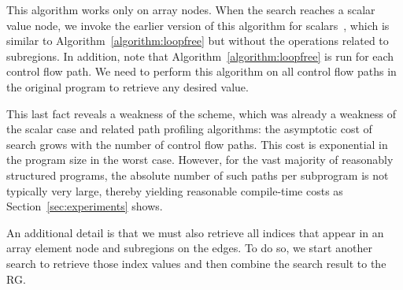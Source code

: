 This algorithm works only on array nodes.
When the search reaches a scalar value node, we invoke the earlier version of this algorithm for scalars~\cite{Hou2012}, which is similar to Algorithm~\ref{algorithm:loopfree} but without the operations related to subregions.
In addition, note that Algorithm~\ref{algorithm:loopfree} is run for each control flow path.
We need to perform this algorithm on all control flow paths in the original program to retrieve any desired value.

This last fact reveals a weakness of the scheme, which was already a weakness of the scalar case and related path profiling algorithms:
the asymptotic cost of search grows with the number of control flow paths.
This cost is exponential in the program size in the worst case.
However, for the vast majority of reasonably structured programs, the absolute number of such paths per subprogram is not typically very large, thereby yielding reasonable compile-time costs as Section~\ref{sec:experiments} shows.

An additional detail is that we must also retrieve all indices that appear in an array element node and subregions on the edges.
To do so, we start another search to retrieve those index values and then combine the search result to the RG.
 


